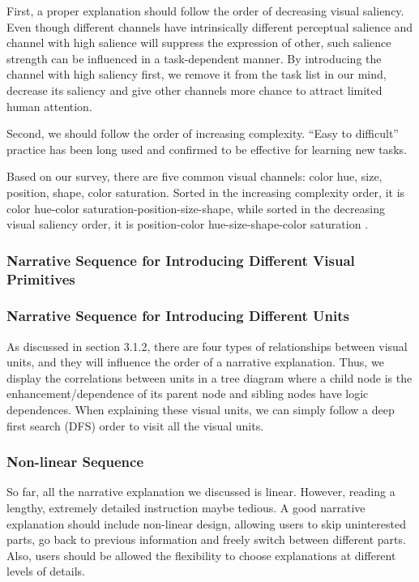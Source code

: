 First, a proper explanation should follow the order of decreasing visual saliency.\cite{cleveland_graphical_1984} Even though different channels have intrinsically different perceptual salience and channel with high salience will suppress the expression of other, such salience strength can be influenced in a task-dependent manner. \cite{nothdurft_salience_2000} By introducing the channel with high saliency first, we remove it from the task list in our mind\cite{}, decrease its saliency and give other channels more chance to attract limited human attention. 

 Second, we should follow the order of increasing complexity. “Easy to difficult” practice has been long used and confirmed to be effective for learning new tasks\cite{bliss_effects_1992}.
 
 Based on our survey, there are five common visual channels: color hue, size, position, shape, color saturation. Sorted in the increasing complexity order, it is color hue-color saturation-position-size-shape, while sorted in the decreasing visual saliency order, it is position-color hue-size-shape-color saturation \cite{munzner_visualization_2014,cleveland_graphical_1984}.  \par

\subsubsection{Narrative Sequence for Introducing Different Visual Primitives}


\subsubsection{Narrative Sequence for Introducing Different Units} 
As discussed in section 3.1.2, there are four types of relationships between visual units, and they will influence the order of a narrative explanation. Thus, we display the correlations between units in a tree diagram where a child node is the enhancement/dependence of its parent node and sibling nodes have logic dependences. When explaining these visual units, we can simply follow a deep first search (DFS) order to visit all the visual units.

\subsubsection{Non-linear Sequence}
So far, all the narrative explanation we discussed is linear. However, reading a lengthy, extremely detailed instruction maybe tedious. A good narrative explanation should include non-linear design, allowing users to skip uninterested parts, go back to previous information and freely switch between different parts. Also, users should be allowed the flexibility to choose explanations at different levels of details. 

